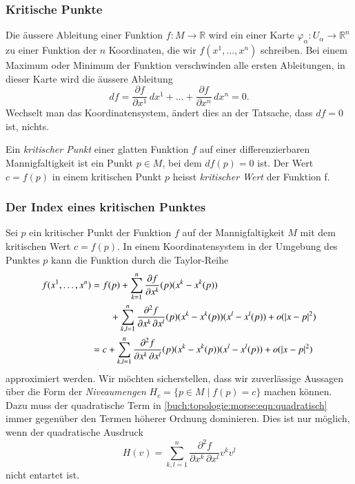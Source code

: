 %
%
\subsubsection{Kritische Punkte}
%
Die äussere Ableitung einer Funktion $f\colon M\to\mathbb{R}$ 
wird ein einer Karte $\varphi_\alpha\colon U_\alpha\to\mathbb{R}^n$
zu einer Funktion der $n$ Koordinaten, die wir $f(x^1,\dots,x^n)$
schreiben.
Bei einem Maximum oder Minimum der Funktion verschwinden alle ersten
Ableitungen, in dieser Karte wird die äussere Ableitung
\[
df
=
\frac{\partial f}{\partial x^1}\,dx^1
+
\dots
+
\frac{\partial f}{\partial x^n}\,dx^n
=
0.
\]
Wechselt man das Koordinatensystem, ändert dies an der Tatsache, dass
$df=0$ ist, nichts.

\begin{definition}
%
%
%
%
Ein \emph{kritischer Punkt} einer glatten Funktion $f$ auf einer
differenzierbaren Mannigfaltigkeit ist ein Punkt $p\in M$, bei dem
$df(p)=0$ ist.
Der Wert $c=f(p)$ in einem kritischen Punkt $p$ heisst
\emph{kritischer Wert} der Funktion f.
\end{definition}

%
%
\subsubsection{Der Index eines kritischen Punktes}
Sei $p$ ein kritischer Punkt der Funktion $f$ auf der Mannigfaltigkeit $M$
mit dem kritischen Wert $c=f(p)$.
In einem Koordinatensystem in der Umgebung des Punktes $p$ kann die Funktion
durch die Taylor-Reihe 
\begin{align}
f(x^1,\dots,x^n)
&=
f(p)
+
\sum_{k=1}^n \frac{\partial f}{\partial x^k}(p) (x^k-x^k(p))
\\
&\qquad\mathstrut
+
\sum_{k,l=1}^n
\frac{\partial^2 f}{\partial x^k\,\partial x^l}(p)
(x^k-x^k(p))(x^l-x^l(p))
+
o(|x-p|^2)
\notag
\\
&=
c
+
\sum_{k,l=1}^n
\frac{\partial^2 f}{\partial x^k\,\partial x^l}(p)
(x^k-x^k(p))(x^l-x^l(p))
+
o(|x-p|^2)
\label{buch:topologie:morse:eqn:quadratisch}
\end{align}
approximiert werden.
Wir möchten sicherstellen, dass wir zuverlässige Aussagen über die
Form der \emph{Niveaumengen} $H_c=\{p\in M\mid f(p)=c\}$ machen können.
Dazu muss der quadratische Term in
\eqref{buch:topologie:morse:eqn:quadratisch}
immer gegenüber den Termen höherer Ordnung dominieren.
Dies ist nur möglich, wenn der quadratische Ausdruck
\[
H(v)
=
\sum_{k,l=1}^n
\frac{\partial^2 f}{\partial x^k\,\partial x^l}
v^k v^l
\]
nicht entartet ist.

